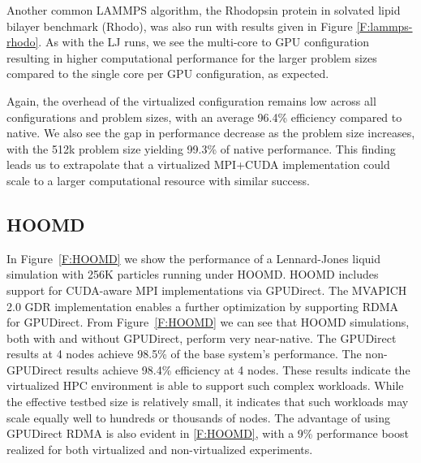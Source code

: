 \documentclass[10pt]{sigplanconf}
\begin{document}

Another common LAMMPS algorithm, the Rhodopsin protein in solvated lipid bilayer benchmark (Rhodo), was also run with results given in Figure \ref{F:lammps-rhodo}. As with the LJ runs, we see the multi-core to GPU configuration resulting in higher computational performance for the larger problem sizes compared to the single core per GPU configuration, as expected.  



Again, the overhead of the virtualized configuration remains low across all configurations and problem sizes, with an average 96.4\% efficiency compared to native. We also see the gap in performance decrease as the problem size increases, with the 512k problem size yielding 99.3\% of native performance.  This finding leads us to extrapolate that a virtualized MPI+CUDA implementation could scale to a larger computational resource with similar success. 


\subsection{HOOMD}






In Figure~\ref{F:HOOMD} we show the performance of a Lennard-Jones liquid simulation with 256K particles running under HOOMD.  HOOMD includes support for CUDA-aware MPI implementations via GPUDirect.  The MVAPICH 2.0 GDR implementation enables a further optimization by supporting RDMA for GPUDirect. From Figure~\ref{F:HOOMD} we can see that HOOMD simulations, both with and without GPUDirect, perform very near-native.  The GPUDirect results at 4 nodes achieve 98.5\% of the base system's performance.  The non-GPUDirect results achieve 98.4\% efficiency at 4 nodes. These results indicate the virtualized HPC environment is able to support such complex workloads. While the effective testbed size is relatively small, it indicates that such workloads may scale equally well to hundreds or thousands of nodes. The advantage of using GPUDirect RDMA is also evident in \ref{F:HOOMD}, with a 9\% performance boost realized for both virtualized and non-virtualized experiments. 
\end{document}

